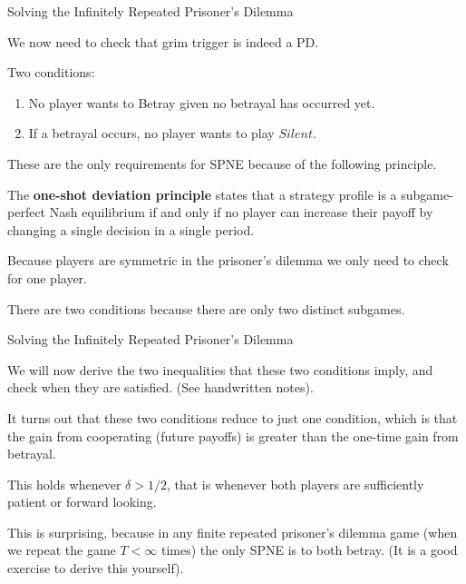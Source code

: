 \documentclass[aspectratio=169]{beamer}
\newenvironment{wideitemize}{\itemize\addtolength{\itemsep}{10pt}}{\enditemize}
\begin{document}
\begin{frame}{Solving the Infinitely Repeated Prisoner's Dilemma}
\begin{wideitemize}
    \item We now need to check that grim trigger is indeed a PD.
    \item Two conditions:
    \begin{enumerate}
        \item No player wants to Betray given no betrayal has occurred yet.
        \item If a betrayal occurs, no player wants to play $Silent$.
    \end{enumerate}
    \item These are the only requirements for SPNE because of the following principle.
    \begin{definition}
    The \textbf{one-shot deviation principle} states that a strategy profile is a subgame-perfect Nash equilibrium if and only if no player can increase their payoff by changing a single decision in a single period. 
    \end{definition}
    \item Because players are symmetric in the prisoner's dilemma we only need to check for one player. 
    \item There are two conditions because there are only two distinct subgames.
    
\end{wideitemize}
\end{frame}

\begin{frame}{Solving the Infinitely Repeated Prisoner's Dilemma}

\begin{wideitemize}
    \item We will now derive the two inequalities that these two conditions imply, and check when they are satisfied. (See handwritten notes). \pause
    \item It turns out that these two conditions reduce to just one condition, which is that the gain from cooperating (future payoffs) is greater than the one-time gain from betrayal.
    \item This holds whenever $\delta > 1/2$, that is whenever both players are sufficiently patient or forward looking.
    \item This is surprising, because in any finite repeated prisoner's dilemma game (when we repeat the game $T<\infty$ times) the only SPNE is to both betray. (It is a good exercise to derive this yourself).
    
\end{wideitemize}


\end{frame}
\end{document}

